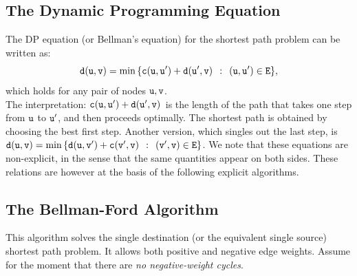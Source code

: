 \subsection{The Dynamic Programming Equation}
The DP equation (or Bellman's equation) for the shortest path problem can be written as:
\[{\tt d}({\tt u},{\tt v}) = \min \,\{ {\tt c}({\tt u},{\tt u}') + {\tt d}({\tt u}',{\tt v})\,\;:\,\;({\tt u},{\tt u}') \in {\tt E}\}, \]
which holds for any pair of nodes ${\tt u},{\tt v}$.
\\
The interpretation: ${\tt c}({\tt u},{\tt u}') + {\tt d}({\tt u}',{\tt v})\,\;$is the length of the path that takes one step from ${\tt u}$ to ${\tt u}'$, and then proceeds optimally. The shortest path is obtained by choosing the best first step.
Another version, which singles out the last step, is
${\tt d}({\tt u},{\tt v}) = \min \,\{ {\tt d}({\tt u},{\tt v}') + {\tt c}({\tt v}',{\tt v})\,\;:\,\;({\tt v}',{\tt v}) \in {\tt E}\} $.
We note that these equations are non-explicit, in the sense that the same quantities appear on both sides.  These relations are however at the basis of the following explicit algorithms.

\subsection{The Bellman-Ford Algorithm}
This algorithm solves the single destination (or the equivalent single source) shortest path problem. It allows both positive and negative edge weights. Assume for the moment that there are \emph{no negative-weight cycles}.


